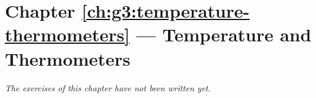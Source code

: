 \section*{Chapter \ref{ch:g3:temperature-thermometers} --- Temperature and Thermometers}


\emph{The exercises of this chapter have not been written yet.}
